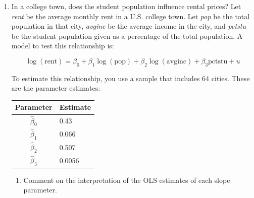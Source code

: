 \documentclass[12pt]{article}
\begin{document}
\begin{enumerate}
\item In a college town, does the student population influence rental prices? Let \textit{rent} be the average monthly rent in a U.S. college town. Let \textit{pop} be the total population in that city, \textit{avginc} be the average income in the city, and \textit{pctstu} be the student population given as a percentage of the total population. A model to test this relationship is:

\[
\log (\text{rent}) = \beta_0 + \beta_1 \log (\text{pop}) + \beta_2 \log (\text{avginc}) + \beta_3 \text{pctstu} + u
\]

To estimate this relationship, you use a sample that includes 64 cities. These are the parameter estimates:
\begin{center}
\begin{tabular}{|c|l|}
\hline Parameter & Estimate \\
\hline $\hat{\beta}_0$ & 0.43 \\
\hline $\hat{\beta}_1$ & 0.066 \\
\hline $\hat{\beta}_2$ & 0.507 \\
\hline $\hat{\beta}_3$ & 0.0056 \\
\hline
\end{tabular}    
\end{center}
\begin{enumerate}
    \item Comment on the interpretation of the OLS estimates of each slope parameter.


\end{enumerate}
\end{enumerate}
\end{document}
